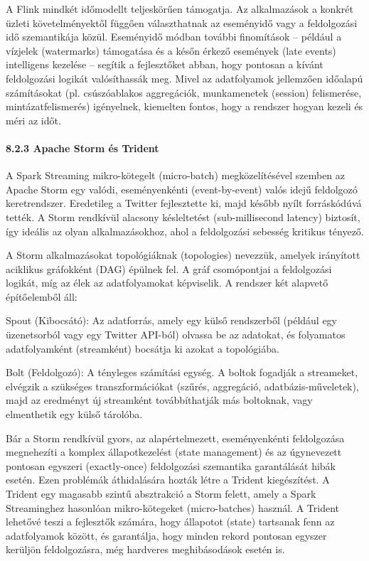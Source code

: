 \documentclass[
]{article}
\begin{document}
A Flink mindkét időmodellt teljeskörűen támogatja. Az alkalmazások a
konkrét üzleti követelményektől függően választhatnak az eseményidő vagy
a feldolgozási idő szemantikája közül. Eseményidő módban további
finomítások -- például a vízjelek (watermarks) támogatása és a későn
érkező események (late events) intelligens kezelése -- segítik a
fejlesztőket abban, hogy pontosan a kívánt feldolgozási logikát
valósíthassák meg. Mivel az adatfolyamok jellemzően időalapú
számításokat (pl. csúszóablakos aggregációk, munkamenetek (session)
felismerése, mintázatfelismerés) igényelnek, kiemelten fontos, hogy a
rendszer hogyan kezeli és méri az időt.

\hypertarget{apache-storm-uxe9s-trident}{%
\paragraph{8.2.3 Apache Storm és
Trident}\label{apache-storm-uxe9s-trident}}

A Spark Streaming mikro-kötegelt (micro-batch) megközelítésével szemben
az Apache Storm egy valódi, eseményenkénti (event-by-event) valós idejű
feldolgozó keretrendszer. Eredetileg a Twitter fejlesztette ki, majd
később nyílt forráskódúvá tették. A Storm rendkívül alacsony
késleltetést (sub-millisecond latency) biztosít, így ideális az olyan
alkalmazásokhoz, ahol a feldolgozási sebesség kritikus tényező.

A Storm alkalmazásokat topológiáknak (topologies) nevezzük, amelyek
irányított aciklikus gráfokként (DAG) épülnek fel. A gráf csomópontjai a
feldolgozási logikát, míg az élek az adatfolyamokat képviselik. A
rendszer két alapvető építőelemből áll:

Spout (Kibocsátó): Az adatforrás, amely egy külső rendszerből (például
egy üzenetsorból vagy egy Twitter API-ból) olvassa be az adatokat, és
folyamatos adatfolyamként (streamként) bocsátja ki azokat a topológiába.

Bolt (Feldolgozó): A tényleges számítási egység. A boltok fogadják a
streameket, elvégzik a szükséges transzformációkat (szűrés, aggregáció,
adatbázis-műveletek), majd az eredményt új streamként továbbíthatják más
boltoknak, vagy elmenthetik egy külső tárolóba.

Bár a Storm rendkívül gyors, az alapértelmezett, eseményenkénti
feldolgozása megnehezíti a komplex állapotkezelést (state management) és
az úgynevezett pontosan egyszeri (exactly-once) feldolgozási szemantika
garantálását hibák esetén. Ezen problémák áthidalására hozták létre a
Trident kiegészítést. A Trident egy magasabb szintű absztrakció a Storm
felett, amely a Spark Streaminghez hasonlóan mikro-kötegeket
(micro-batches) használ. A Trident lehetővé teszi a fejlesztők számára,
hogy állapotot (state) tartsanak fenn az adatfolyamok között, és
garantálja, hogy minden rekord pontosan egyszer kerüljön feldolgozásra,
még hardveres meghibásodások esetén is.
\end{document}
